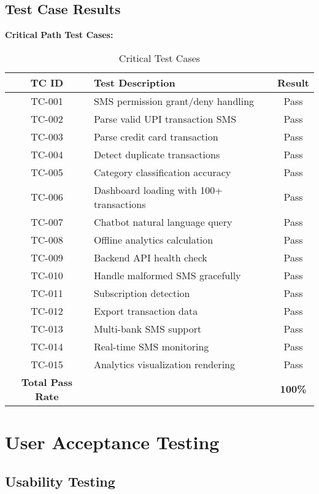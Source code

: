 \documentclass[11pt,a4paper]{report}
\begin{document}
\subsection{Test Case Results}

\textbf{Critical Path Test Cases:}

\begin{table}[H]
\centering
\caption{Critical Test Cases}
\begin{tabular}{|c|L{5cm}|c|}
\hline
\textbf{TC ID} & \textbf{Test Description} & \textbf{Result} \\
\hline
TC-001 & SMS permission grant/deny handling & Pass \\
TC-002 & Parse valid UPI transaction SMS & Pass \\
TC-003 & Parse credit card transaction & Pass \\
TC-004 & Detect duplicate transactions & Pass \\
TC-005 & Category classification accuracy & Pass \\
TC-006 & Dashboard loading with 100+ transactions & Pass \\
TC-007 & Chatbot natural language query & Pass \\
TC-008 & Offline analytics calculation & Pass \\
TC-009 & Backend API health check & Pass \\
TC-010 & Handle malformed SMS gracefully & Pass \\
TC-011 & Subscription detection & Pass \\
TC-012 & Export transaction data & Pass \\
TC-013 & Multi-bank SMS support & Pass \\
TC-014 & Real-time SMS monitoring & Pass \\
TC-015 & Analytics visualization rendering & Pass \\
\hline
\textbf{Total Pass Rate} & & \textbf{100\%} \\
\hline
\end{tabular}
\end{table}

\section{User Acceptance Testing}

\subsection{Usability Testing}
\end{document}
